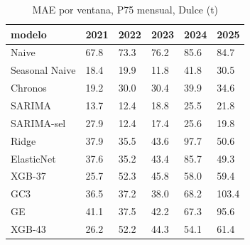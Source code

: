 \begin{table}[H]
\centering
\small
\caption{MAE por ventana, P75 mensual, Dulce (t)}
\label{tab:T05_MAE_P75_por_ventana_dulce}
\begin{tabular}{llllll}
\toprule
modelo & 2021 & 2022 & 2023 & 2024 & 2025 \\
\midrule
Naive & 67.8 & 73.3 & 76.2 & 85.6 & 84.7 \\
Seasonal Naive & 18.4 & 19.9 & 11.8 & 41.8 & 30.5 \\
Chronos & 19.2 & 30.0 & 30.4 & 39.9 & 34.6 \\
SARIMA & 13.7 & 12.4 & 18.8 & 25.5 & 21.8 \\
SARIMA-sel & 27.9 & 12.4 & 17.4 & 25.6 & 19.8 \\
Ridge & 37.9 & 35.5 & 43.6 & 97.7 & 50.6 \\
ElasticNet & 37.6 & 35.2 & 43.4 & 85.7 & 49.3 \\
XGB-37 & 25.7 & 52.3 & 45.8 & 58.0 & 59.4 \\
GC3 & 36.5 & 37.2 & 38.0 & 68.2 & 103.4 \\
GE & 41.1 & 37.5 & 42.2 & 67.3 & 95.6 \\
XGB-43 & 26.2 & 52.2 & 44.3 & 54.1 & 61.4 \\
\bottomrule
\end{tabular}
\end{table}